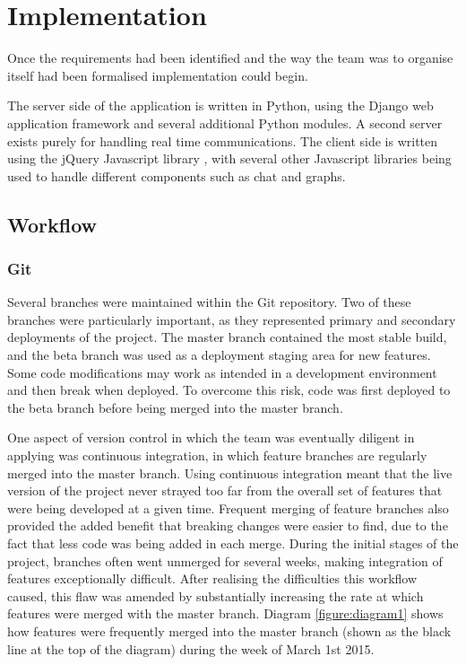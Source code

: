 \documentclass[a4paper]{l3proj}
\begin{document}
\chapter{Implementation}
\label{impl}

Once the requirements had been identified and the way the team was to organise itself had been formalised implementation could begin. 

The server side of the application is written in Python, using the Django web application framework and several additional Python modules. A second server exists purely for handling real time communications. The client side is written using the jQuery Javascript library \cite{site:jquery}, with several other Javascript libraries being used to handle different components such as chat and graphs. 

\section{Workflow}
\label{workflow}

\subsection{Git}
\label{git}

Several branches were maintained within the Git repository. Two of these branches were particularly important, as they represented primary and secondary deployments of the project. The master branch contained the most stable build, and the beta branch was used as a deployment staging area for new features. Some code modifications may work as intended in a development environment and then break when deployed. To overcome this risk, code was first deployed to the beta branch before being merged into the master branch.

One aspect of version control in which the team was eventually diligent in applying was continuous integration, in which feature branches are regularly merged into the master branch. Using continuous integration meant that the live version of the project never strayed too far from the overall set of features that were being developed at a given time. Frequent merging of feature branches also provided the added benefit that breaking changes were easier to find, due to the fact that less code was being added in each merge. During the initial stages of the project, branches often went unmerged for several weeks, making integration of features exceptionally difficult. After realising the difficulties this workflow caused, this flaw was amended by substantially increasing the rate at which features were merged with the master branch. Diagram \ref{figure:diagram1} shows how features were frequently merged into the master branch (shown as the black line at the top of the diagram) during the week of March 1st 2015.
\end{document}
